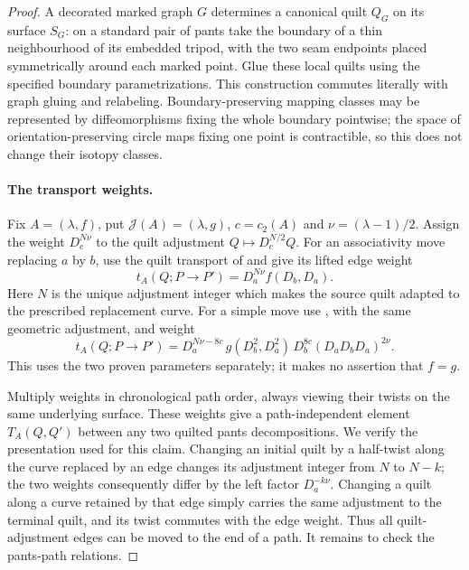 \begin{proof}
A decorated marked graph $G$ determines a
canonical quilt $Q_G$ on its surface $S_G$:
on a standard pair of pants take the boundary
of a thin neighbourhood of its embedded
tripod, with the two seam endpoints placed
symmetrically around each marked point.
Glue these local quilts using the specified
boundary parametrizations.  This construction
commutes literally with graph gluing and
relabeling.  Boundary-preserving mapping
classes may be represented by diffeomorphisms
fixing the whole boundary pointwise; the
space of orientation-preserving circle maps
fixing one point is contractible, so this
does not change their isotopy classes.

\paragraph{The transport weights.}
Fix $A=(\lambda,f)$, put
$\mathcal J(A)=(\lambda,g)$,
$c=c_2(A)$ and $\nu=(\lambda-1)/2$.
Assign the weight $D_c^{N\nu}$ to the
quilt adjustment $Q\mapsto D_c^{N/2}Q$.
For an associativity move replacing $a$ by
$b$, use the quilt transport of
\cite[Definition 7.2(a)]{ET_NS2000} and give
its lifted edge weight
\[
 t_A(Q;P\to P')=D_a^{N\nu}f(D_b,D_a).
                                                               \tag{E.111}
\]
Here $N$ is the unique adjustment integer
which makes the source quilt adapted to
the prescribed replacement curve.
For a simple move use
\cite[Definition 7.2(b)]{ET_NS2000}, with
the same geometric adjustment, and weight
\[
 t_A(Q;P\to P')
   =D_a^{N\nu-8c}\,
      g(D_b^2,D_a^2)\,
      D_b^{8c}(D_aD_bD_a)^{2\nu}.                     \tag{E.112}
\]
This uses the two proven parameters separately;
it makes no assertion that $f=g$.

Multiply weights in chronological path order,
always viewing their twists on the same
underlying surface.  These weights give a
path-independent element $T_A(Q,Q')$ between
any two quilted pants decompositions.
We verify the presentation used for this claim.
Changing an initial quilt by a half-twist
along the curve replaced by an edge changes
its adjustment integer from $N$ to $N-k$;
the two weights consequently differ by the
left factor $D_a^{-k\nu}$.  Changing a quilt
along a curve retained by that edge simply
carries the same adjustment to the terminal
quilt, and its twist commutes with the
edge weight.  Thus all quilt-adjustment
edges can be moved to the end of a path.
It remains to check the pants-path relations.


\end{proof}
